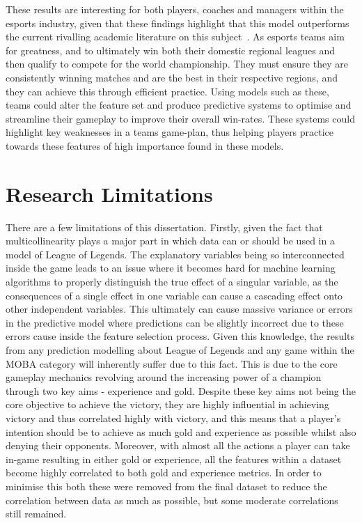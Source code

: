 These results are interesting for both players, coaches and managers within the esports industry, given that these findings highlight that this model outperforms the current rivalling academic literature on this subject~\citep{lee2020predicting, silva2018continuous}.
As esports teams aim for greatness, and to ultimately win both their domestic regional leagues and then qualify to compete for the world championship.
They must ensure they are consistently winning matches and are the best in their respective regions, and they can achieve this through efficient practice.
Using models such as these, teams could alter the feature set and produce predictive systems to optimise and streamline their gameplay to improve their overall win-rates.
These systems could highlight key weaknesses in a teams game-plan, thus helping players practice towards these features of high importance found in these models.

\section{Research Limitations}\label{sec:Research Limitations}

There are a few limitations of this dissertation.
Firstly, given the fact that multicollinearity plays a major part in which data can or should be used in a model of League of Legends.
The explanatory variables being so interconnected inside the game leads to an issue where it becomes hard for machine learning algorithms to properly distinguish the true effect of a singular variable, as the consequences of a single effect in one variable can cause a cascading effect onto other independent variables.
This ultimately can cause massive variance or errors in the predictive model where predictions can be slightly incorrect due to these errors cause inside the feature selection process.
Given this knowledge, the results from any prediction modelling about League of Legends and any game within the MOBA category will inherently suffer due to this fact.
This is due to the core gameplay mechanics revolving around the increasing power of a champion through two key aims - experience and gold.
Despite these key aims not being the core objective to achieve the victory, they are highly influential in achieving victory and thus correlated highly with victory, and this means that a player's intention should be to achieve as much gold and experience as possible whilst also denying their opponents.
Moreover, with almost all the actions a player can take in-game resulting in either gold or experience, all the features within a dataset become highly correlated to both gold and experience metrics.
In order to minimise this both these were removed from the final dataset to reduce the correlation between data as much as possible, but some moderate correlations still remained.


